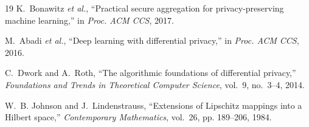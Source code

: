 \documentclass[conference]{IEEEtran}
\begin{document}
\begin{thebibliography}{19}
 K.~Bonawitz \emph{et al.}, ``Practical secure aggregation
for privacy-preserving machine learning,'' in \emph{Proc. ACM CCS}, 2017.

 M.~Abadi \emph{et al.}, ``Deep learning with differential
privacy,'' in \emph{Proc. ACM CCS}, 2016.

 C.~Dwork and A.~Roth, ``The algorithmic foundations of
differential privacy,'' \emph{Foundations and Trends in Theoretical Computer
Science}, vol.~9, no.~3--4, 2014.

 W.~B. Johnson and J.~Lindenstrauss, ``Extensions of Lipschitz
mappings into a Hilbert space,'' \emph{Contemporary Mathematics}, vol.~26,
pp. 189--206, 1984.

\end{thebibliography}
\end{document}
